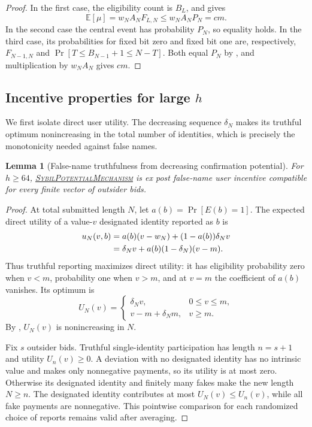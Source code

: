 \documentclass[11pt]{article}
\newtheorem{lemma}{Lemma}[section]
\begin{document}
\begin{proof}
In the first case, the eligibility count is $B_L$, and
 gives
\[
\mathbb{E}[\mu]=w_NA_NF_{L,N}
\le w_NA_NP_N=cm.
\]
In the second case the central event has probability $P_N$, so equality holds.
In the third case, its probabilities for fixed bit zero and fixed bit one are,
respectively,
$F_{N-1,N}$ and $\Pr[T\le B_{N-1}+1\le N-T]$.  Both equal $P_N$ by
, and multiplication by $w_NA_N$ gives $cm$.
\end{proof}

\subsection{Incentive properties for large \texorpdfstring{$h$}{h}}

We first isolate direct user utility.  The decreasing sequence $\delta_N$
makes its truthful optimum nonincreasing in the total number of identities,
which is precisely the monotonicity needed against false names.

\begin{lemma}[False-name truthfulness from decreasing confirmation potential]
\label{lem:large-uic}
For $h\ge64$,
\hyperref[alg:sybil-potential-mechanism]{\textsc{SybilPotentialMechanism}}
is ex post false-name user incentive compatible for every finite vector of
outsider bids.
\end{lemma}

\begin{proof}
At total submitted length $N$, let $a(b)=\Pr[E(b)=1]$.  The expected direct
utility of a value-$v$ designated identity reported as $b$ is
\begin{align}
u_N(v,b)
&=a(b)(v-w_N)+(1-a(b))\delta_Nv\notag\\
&=\delta_Nv+a(b)(1-\delta_N)(v-m).
\label{eq:direct-utility}
\end{align}
Thus truthful reporting maximizes direct utility: it has eligibility
probability zero when $v<m$, probability one when $v>m$, and at $v=m$ the
coefficient of $a(b)$ vanishes.  Its optimum is
\begin{equation}
U_N(v)=
\begin{cases}
\delta_Nv,&0\le v\le m,\\[1ex]
v-m+\delta_Nm,&v\ge m.
\end{cases}
\label{eq:truthful-utility}
\end{equation}
By , $U_N(v)$ is nonincreasing in $N$.

Fix $s$ outsider bids.  Truthful single-identity participation has length
$n=s+1$ and utility $U_n(v)\ge0$.  A deviation with no designated identity
has no intrinsic value and makes only nonnegative payments, so its utility is
at most zero.  Otherwise its designated identity and finitely many fakes make
the new length $N\ge n$.  The designated identity contributes at most
$U_N(v)\le U_n(v)$, while all fake payments are nonnegative.  This pointwise
comparison for each randomized choice of reports remains valid after
averaging.
\end{proof}
\end{document}

